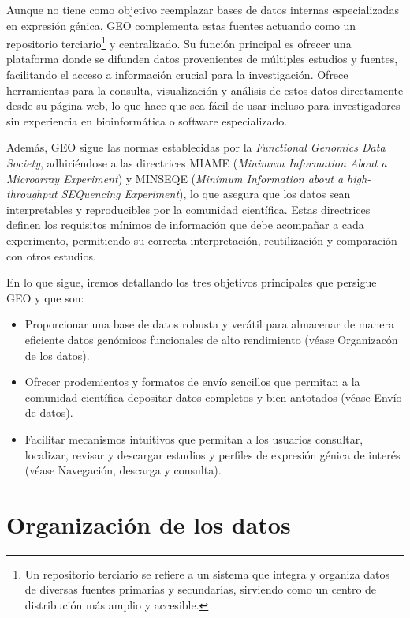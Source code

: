 Aunque no tiene como objetivo reemplazar bases de datos internas especializadas en expresión génica, GEO complementa estas fuentes actuando como 
un repositorio terciario\footnote[1]{Un repositorio terciario se refiere a un sistema que integra y organiza datos de diversas 
fuentes primarias y secundarias, sirviendo como un centro de distribución más amplio y accesible.} y centralizado. Su función principal es ofrecer una plataforma 
donde se difunden datos provenientes de múltiples estudios y fuentes, facilitando el acceso a información crucial para la investigación. Ofrece herramientas 
para la consulta, visualización y análisis de estos datos directamente desde su página web, lo que hace que sea fácil de usar incluso para investigadores 
sin experiencia en bioinformática o software especializado.\newline

Además, GEO sigue las normas establecidas por la \textit{Functional Genomics Data Society}, adhiriéndose a las directrices MIAME (\textit{Minimum Information About a Microarray Experiment}) 
y MINSEQE (\textit{Minimum Information about a high-throughput SEQuencing Experiment}), lo que asegura que los datos sean interpretables y reproducibles 
por la comunidad científica. Estas directrices definen los requisitos mínimos de información que debe acompañar a cada experimento, permitiendo 
su correcta interpretación, reutilización y comparación con otros estudios. \newline

En lo que sigue, iremos detallando los tres objetivos principales que persigue GEO y que son:

\begin{itemize}
    \item[1.] Proporcionar una base de datos robusta y verátil para almacenar de manera eficiente datos genómicos funcionales de alto rendimiento
    (véase Organizacón de los datos).
    \item[2.] Ofrecer prodemientos y formatos de envío sencillos que permitan a la comunidad científica depositar datos completos y bien antotados
    (véase Envío de datos).
    \item[3.] Facilitar mecanismos intuitivos que permitan a los usuarios consultar, localizar, revisar y descargar estudios y perfiles de expresión génica
    de interés (véase Navegación, descarga y consulta).
\end{itemize}


\section{Organización de los datos}

